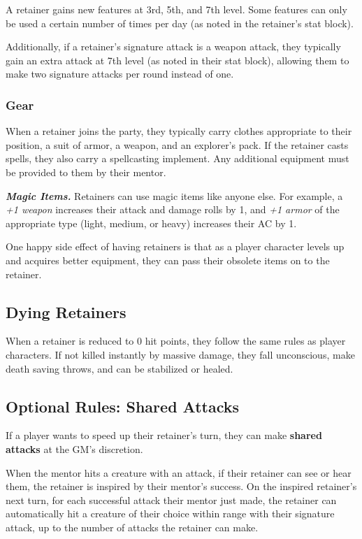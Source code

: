 \documentclass[10pt,a4paper,twoside,bg=print,twocolumn,openany,nodeprecatedcode]{dndbook}
\begin{document}
A retainer gains new features at 3rd, 5th, and 7th level. Some features can only be used a certain number of times per day (as noted in the retainer's stat block).

Additionally, if a retainer's signature attack is a weapon attack, they typically gain an extra attack at 7th level (as noted in their stat block), allowing them to make two signature attacks per round instead of one.

\subsubsection{Gear}
When a retainer joins the party, they typically carry clothes appropriate to their position, a suit of armor, a weapon, and an explorer's pack. If the retainer casts spells, they also carry a spellcasting implement. Any additional equipment must be provided to them by their mentor.

\textit{\textbf{Magic Items.}} Retainers can use magic items like anyone else. For example, a \textit{+1 weapon} increases their attack and damage rolls by 1, and \textit{+1 armor} of the appropriate type (light, medium, or heavy) increases their AC by 1.

One happy side effect of having retainers is that as a player character levels up and acquires better equipment, they can pass their obsolete items on to the retainer.

\subsection{Dying Retainers}
When a retainer is reduced to 0 hit points, they follow the same rules as player characters. If not killed instantly by massive damage, they fall unconscious, make death saving throws, and can be stabilized or healed.

\subsection{Optional Rules: Shared Attacks}
If a player wants to speed up their retainer's turn, they can make \textbf{shared attacks} at the GM's discretion.

When the mentor hits a creature with an attack, if their retainer can see or hear them, the retainer is inspired by their mentor's success. On the inspired retainer's next turn, for each successful attack their mentor just made, the retainer can automatically hit a creature of their choice within range with their signature attack, up to the number of attacks the retainer can make.
\end{document}
